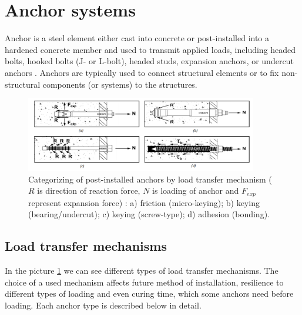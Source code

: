 
\thispagestyle{plain}
\section{Anchor systems}
Anchor is a steel element either cast into concrete or post-installed into a hardened concrete member and used to transmit applied loads, including headed bolts, hooked bolts (J- or L-bolt), headed studs, expansion anchors, or undercut anchors \cite{anchors-ACI-318M}. Anchors are typically used to connect structural elements or to fix non-structural components (or systems) to the structures. 

\begin{figure}[h!]
	\centering
	\includegraphics[width=0.9\textwidth]{obrazky/post_installed_anchor_types_repaired.png}
	\caption[Categorizing of post-installed anchors by load transfer mechanism]{Categorizing of post-installed anchors by load transfer mechanism ($R$ is direction of reaction force, $N$ is loading of anchor and $F_{exp}$ represent expansion force) \cite{hilti_anchors}: a) friction (micro-keying); b) keying (bearing/undercut); c) keying (screw-type); d) adhesion (bonding).}\label{obr:Post_installed_anchors}
\end{figure}

\subsection{Load transfer mechanisms}
In the picture \ref{obr:Post_installed_anchors} we can see different types of load transfer mechanisms. The choice of a  used mechanism affects future method of installation, resilience to different types of loading and even curing time, which some anchors need before loading. Each anchor type is described below in detail. 


